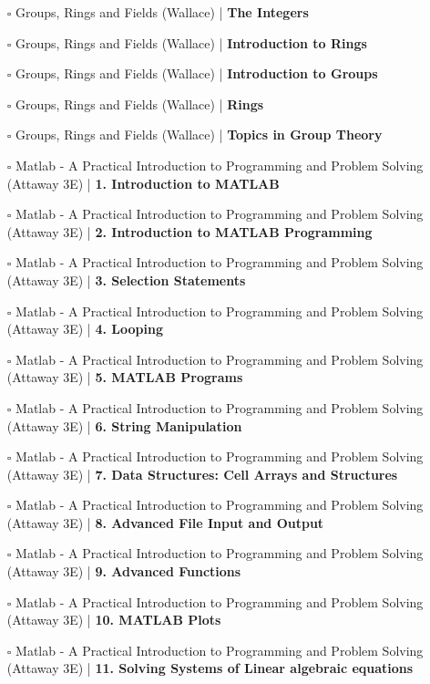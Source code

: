 \documentclass[a4, landscape, 12pt]{article}
\newcommand{\checkbox}{$\square$}%
\begin{document}
\begin{itemize}
{}
\item [\checkbox] Groups, Rings and Fields (Wallace)  | \textbf{The Integers
}
\item [\checkbox] Groups, Rings and Fields (Wallace)  | \textbf{Introduction to Rings
}
\item [\checkbox] Groups, Rings and Fields (Wallace)  | \textbf{Introduction to Groups
}
\item [\checkbox] Groups, Rings and Fields (Wallace)  | \textbf{Rings
}
\item [\checkbox] Groups, Rings and Fields (Wallace)  | \textbf{Topics in Group Theory
}
\item [\checkbox] Matlab - A Practical Introduction to Programming and Problem Solving (Attaway 3E)  | \textbf{1. Introduction to MATLAB
}
\item [\checkbox] Matlab - A Practical Introduction to Programming and Problem Solving (Attaway 3E)  | \textbf{2. Introduction to MATLAB Programming
}
\item [\checkbox] Matlab - A Practical Introduction to Programming and Problem Solving (Attaway 3E)  | \textbf{3. Selection Statements
}
\item [\checkbox] Matlab - A Practical Introduction to Programming and Problem Solving (Attaway 3E)  | \textbf{4. Looping
}
\item [\checkbox] Matlab - A Practical Introduction to Programming and Problem Solving (Attaway 3E)  | \textbf{5. MATLAB Programs
}
\item [\checkbox] Matlab - A Practical Introduction to Programming and Problem Solving (Attaway 3E)  | \textbf{6. String Manipulation
}
\item [\checkbox] Matlab - A Practical Introduction to Programming and Problem Solving (Attaway 3E)  | \textbf{7. Data Structures: Cell Arrays and Structures
}
\item [\checkbox] Matlab - A Practical Introduction to Programming and Problem Solving (Attaway 3E)  | \textbf{8. Advanced File Input and Output
}
\item [\checkbox] Matlab - A Practical Introduction to Programming and Problem Solving (Attaway 3E)  | \textbf{9. Advanced Functions
}
\item [\checkbox] Matlab - A Practical Introduction to Programming and Problem Solving (Attaway 3E)  | \textbf{10. MATLAB Plots
}
\item [\checkbox] Matlab - A Practical Introduction to Programming and Problem Solving (Attaway 3E)  | \textbf{11. Solving Systems of Linear algebraic equations
}
\end{itemize}
\end{document}
